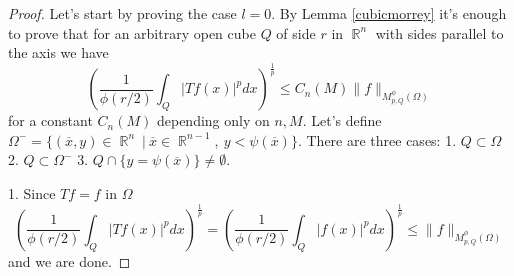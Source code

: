 \documentclass[12pt]{article}
\theoremstyle{definition}
\DeclareMathOperator\rr{\mathbb{R}}
\begin{document}
\begin{proof}
Let's start by proving the case $l=0$. By Lemma \ref{cubicmorrey} it's enough to prove that for an arbitrary open cube $Q$ of side $r$ in $\rr^n$ with sides parallel to the axis we have
\begin{equation}
\left(\frac{1}{\phi(r/2)}\int_Q |Tf(x)|^pdx \right)^{\frac{1}{p}} \le C_n(M) \| f\|_{M_{p,Q}^\phi(\Omega)}
\end{equation}
for a constant $C_n(M)$ depending only on $n,M$. Let's define  $\Omega^- = \{ (\overline x , y) \in \rr^n \ | \ \overline x \in \rr^{n-1}, \ y<\psi(\overline x) \}$. There are three cases: 1. $Q \subset \Omega$ 2. $Q \subset \Omega^-$ 3. $Q\cap \{y=\psi(\overline x)\} \neq \emptyset.$ 

1. Since $Tf=f$ in $\Omega$
\[ \left(\frac{1}{\phi(r/2)}\int_Q |Tf(x)|^pdx \right)^{\frac{1}{p}}=\left(\frac{1}{\phi(r/2)}\int_Q |f(x)|^pdx \right)^{\frac{1}{p}} \le  \| f\|_{M_{p,Q}^\phi(\Omega)}\]
and we are done.


\end{proof}
\end{document}
